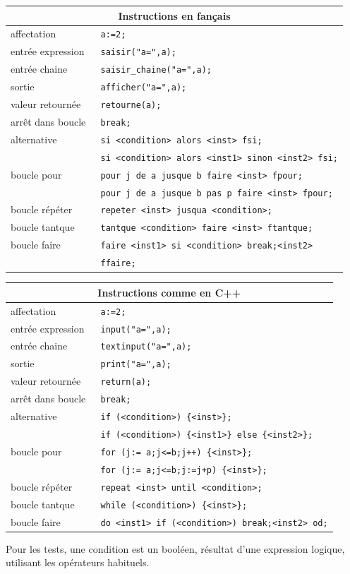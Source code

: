 \documentclass{article}
\begin{document}
\begin{center}
\begin{tabular}{|ll|}
\hline
\multicolumn{2}{|c|}{\bf Instructions en fan\c{c}ais}\\
\hline\hline
affectation& \verb| a:=2;|\\
entr\'ee expression& \verb| saisir("a=",a);| \\
entr\'ee chaine& \verb| saisir_chaine("a=",a);| \\
sortie& \verb| afficher("a=",a);|\\
valeur retourn\'ee& \verb| retourne(a);|\\
arr\^et dans boucle& \verb| break;|\\
alternative& \verb| si <condition> alors <inst> fsi;| \\
           &\verb| si <condition> alors <inst1> sinon <inst2> fsi;| \\
boucle pour& \verb| pour j de a jusque b faire <inst> fpour;|\\
           & \verb| pour j de a jusque b pas p faire <inst> fpour;|\\
boucle r\'ep\'eter& \verb| repeter <inst> jusqua <condition>;|\\
boucle tantque& \verb| tantque <condition> faire <inst> ftantque;|\\
boucle faire& \verb| faire <inst1> si <condition> break;<inst2>|\\ 
            &\verb| ffaire;|\\
\hline
\end{tabular}
\end{center}


\begin{center}
\begin{tabular}{|ll|}
\hline
\multicolumn{2}{|c|}{\bf Instructions comme en C++}\\
\hline\hline
affectation& \verb| a:=2;|\\
entr\'ee expression& \verb| input("a=",a);| \\
entr\'ee chaine& \verb| textinput("a=",a);| \\
sortie& \verb| print("a=",a);|\\
valeur retourn\'ee& \verb| return(a);|\\
arr\^et dans boucle& \verb| break;|\\
alternative& \verb| if (<condition>) {<inst>};| \\
           & \verb| if (<condition>) {<inst1>} else {<inst2>};| \\
boucle pour& \verb| for (j:= a;j<=b;j++) {<inst>};|\\
           & \verb| for (j:= a;j<=b;j:=j+p) {<inst>};|\\
boucle r\'ep\'eter& \verb| repeat <inst> until <condition>;|\\
boucle tantque& \verb| while (<condition>) {<inst>};|\\
boucle faire& \verb| do <inst1> if (<condition>) break;<inst2> od;|\\
\hline
\end{tabular}
\end{center}
Pour les tests, une condition est un bool\'een,
r\'esultat d'une expression logique, utilisant les
op\'erateurs habituels.
\end{document}
